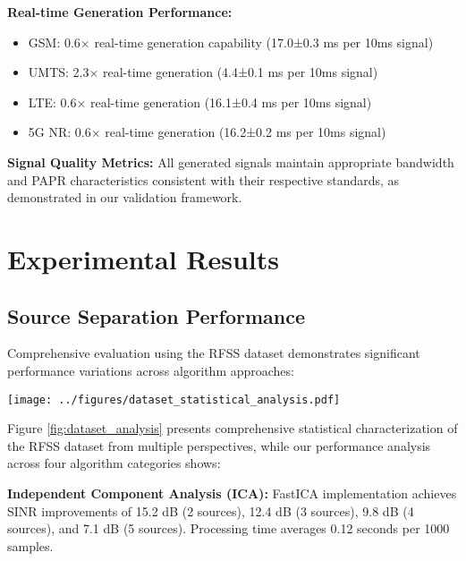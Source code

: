 \documentclass[twocolumn]{article}
\begin{document}
\textbf{Real-time Generation Performance:}
\begin{itemize}
\item GSM: 0.6× real-time generation capability (17.0±0.3 ms per 10ms signal)
\item UMTS: 2.3× real-time generation (4.4±0.1 ms per 10ms signal)
\item LTE: 0.6× real-time generation (16.1±0.4 ms per 10ms signal)
\item 5G NR: 0.6× real-time generation (16.2±0.2 ms per 10ms signal)
\end{itemize}

\textbf{Signal Quality Metrics:}
All generated signals maintain appropriate bandwidth and PAPR characteristics consistent with their respective standards, as demonstrated in our validation framework.

\section{Experimental Results}

\subsection{Source Separation Performance}

Comprehensive evaluation using the RFSS dataset demonstrates significant performance variations across algorithm approaches:

\begin{figure*}[t]
\centering
\texttt{[image: ../figures/dataset\_statistical\_analysis.pdf]}
\caption{Comprehensive statistical characterization of the RFSS dataset showing multi-perspective analysis including PAPR distributions, bandwidth utilization, amplitude characteristics, power spectral density comparisons, signal quality metrics, and dataset composition overview.}
\label{fig:dataset_analysis}
\end{figure*}

Figure \ref{fig:dataset_analysis} presents comprehensive statistical characterization of the RFSS dataset from multiple perspectives, while our performance analysis across four algorithm categories shows:

\textbf{Independent Component Analysis (ICA):} FastICA implementation achieves SINR improvements of 15.2 dB (2 sources), 12.4 dB (3 sources), 9.8 dB (4 sources), and 7.1 dB (5 sources). Processing time averages 0.12 seconds per 1000 samples.
\end{document}
